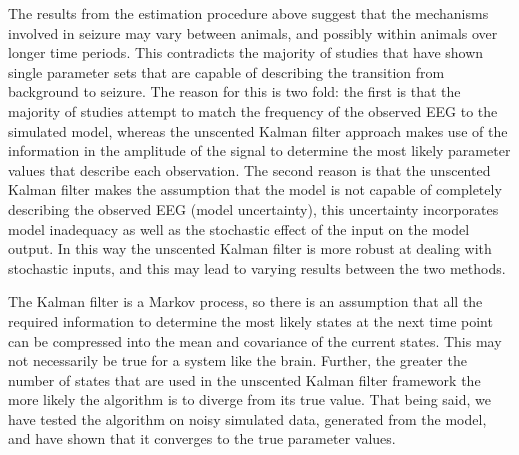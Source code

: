 The results from the estimation procedure above suggest that the mechanisms involved in seizure may vary between animals, and possibly within animals over longer time periods. This contradicts the majority of studies that have shown single parameter sets that are capable of describing the transition from background to seizure. The reason for this is two fold: the first is that the majority of studies attempt to match the frequency of the observed EEG to the simulated model, whereas the unscented Kalman filter approach makes use of the information in the amplitude of the signal to determine the most likely parameter values that describe each observation. The second reason is that the unscented Kalman filter makes the assumption that the model is not capable of completely describing the observed EEG (model uncertainty), this uncertainty incorporates model inadequacy as well as the stochastic effect of the input on the model output. In this way the unscented Kalman filter is more robust at dealing with stochastic inputs, and this may lead to varying results between the two methods. 

The Kalman filter is a Markov process, so there is an assumption that all the required information to determine the most likely states at the next time point can be compressed into the mean and covariance of the current states. This may not necessarily be true for a system like the brain. Further, the greater the number of states that are used in the unscented Kalman filter framework the more likely the algorithm is to diverge from its true value. That being said, we have tested the algorithm on noisy simulated data, generated from the model, and have shown that it converges to the true parameter values.


